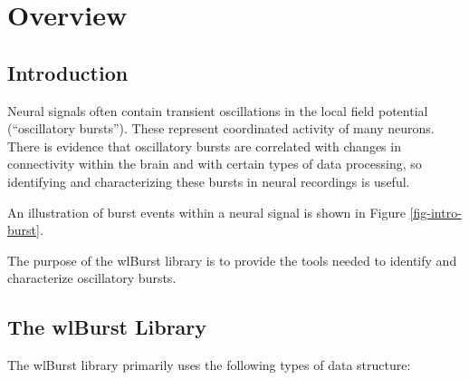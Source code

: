 
\chapter{Overview}
\label{sect-over}

%
%
%
\section{Introduction}
\label{sect-over-intro}

Neural signals often contain transient oscillations in the local field
potential (``oscillatory bursts''). These represent coordinated activity of
many neurons. There is evidence that oscillatory bursts are correlated with
changes in connectivity within the brain and with certain types of data
processing, so identifying and characterizing these bursts in neural
recordings is useful.

An illustration of burst events within a neural signal is shown in Figure
\ref{fig-intro-burst}.

The purpose of the wlBurst library is to provide the tools needed to identify
and characterize oscillatory bursts.

%
%
%
\section{The wlBurst Library}
\label{sect-over-lib}

The wlBurst library primarily uses the following types of data structure:

